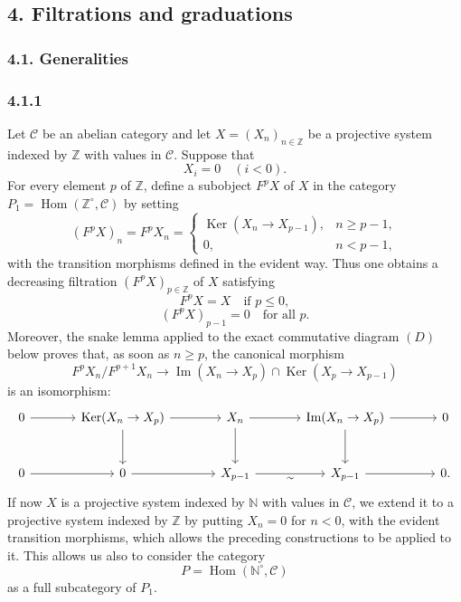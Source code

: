 \documentclass[11pt]{article}
\providecommand{\ZZ}{\mathbb{Z}}
\providecommand{\NN}{\mathbb{N}}
\DeclareMathOperator{\Hom}{Hom}
\providecommand{\Ker}{\operatorname{Ker}}
\providecommand{\Hom}{\operatorname{Hom}}
\providecommand{\NN}{\mathbb N}
\providecommand{\cC}{\mathcal C}
\providecommand{\Im}{\operatorname{Im}}
\providecommand{\Ker}{\operatorname{Ker}}
\renewcommand{\Im}{\operatorname{Im}}
\providecommand{\Ker}{\operatorname{Ker}}
\providecommand{\Im}{\operatorname{Im}}
\providecommand{\cC}{\mathcal C}
\providecommand{\Hom}{\operatorname{Hom}}
\begin{document}
\subsection*{4. Filtrations and graduations}\label{sga5:V:subsection:4}
\subsubsection*{4.1. Generalities}\label{sga5:V:subsubsection:4.1}
\subsubsection*{4.1.1}\label{sga5:V:subsubsection:4.1.1}
Let $\cC$ be an abelian category and let $X=(X_n)_{n\in\ZZ}$ be a projective system indexed by $\ZZ$ with values in $\cC$. Suppose that
\[
X_i=0\quad(i<0).
\]
For every element $p$ of $\ZZ$, define a subobject $F^pX$ of $X$ in the category $P_1=\Hom(\ZZ^\circ,\cC)$ by setting
\[
(F^pX)_n=F^pX_n=
\begin{cases}
\Ker(X_n\to X_{p-1}),& n\ge p-1,\\
0,& n<p-1,
\end{cases}
\]
with the transition morphisms defined in the evident way. Thus one obtains a decreasing filtration $(F^pX)_{p\in\ZZ}$ of $X$ satisfying
\begin{equation}\tag{a}\label{sga5:V:equation:a}
F^pX=X\quad\text{if }p\le0,
\end{equation}
\begin{equation}\tag{b}\label{sga5:V:equation:b}
(F^pX)_{p-1}=0\quad\text{for all }p.
\end{equation}
Moreover, the snake lemma applied to the exact commutative diagram $(D)$ below proves that, as soon as $n\ge p$, the canonical morphism
\[
F^pX_n/F^{p+1}X_n\longrightarrow \Im(X_n\to X_p)\cap\Ker(X_p\to X_{p-1})
\]
is an isomorphism:
\[
\begin{tikzcd}[column sep=large,row sep=large]
0 \arrow[r] & \Ker(X_n\to X_p) \arrow[r] \arrow[d] & X_n \arrow[r] \arrow[d] & \Im(X_n\to X_p) \arrow[r] \arrow[d] & 0\\
0 \arrow[r] & 0 \arrow[r] & X_{p-1} \arrow[r,"\sim"'] & X_{p-1} \arrow[r] & 0 .
\end{tikzcd}
\]
If now $X$ is a projective system indexed by $\NN$ with values in $\cC$, we extend it to a projective system indexed by $\ZZ$ by putting $X_n=0$ for $n<0$, with the evident transition morphisms, which allows the preceding constructions to be applied to it. This allows us also to consider the category
\[
P=\Hom(\NN^\circ,\cC)
\]
as a full subcategory of $P_1$.
\end{document}
